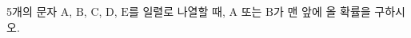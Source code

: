 5개의 문자 $\mathrm{A}$, $\mathrm{B}$, $\mathrm{C}$, $\mathrm{D}$, $\mathrm{E}$를 일렬로 나열할 때, $\mathrm{A}$ 또는 $\mathrm{B}$가 맨 앞에 올 확률을 구하시오.
